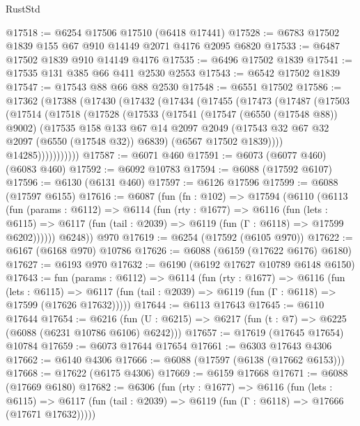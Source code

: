 \begin{lexlean}{RustStd}
\begin{coremodule}
@17518 := @6254 @17506 @17510 (@6418 @17441)
@17528 := @6783 @17502 @1839 @155 @67 @910 @14149 @2071 @4176 @2095 @6820
@17533 := @6487 @17502 @1839 @910 @14149 @4176
@17535 := @6496 @17502 @1839
@17541 := @17535 @131 @385 @66 @411 @2530 @2553
@17543 := @6542 @17502 @1839
@17547 := @17543 @88 @66 @88 @2530
@17548 := @6551 @17502
@17586 := @17362
    (@17388
      (@17430
        (@17432
          (@17434
            (@17455
              (@17473
                (@17487
                  (@17503
                    (@17514
                      (@17518
                        (@17528
                          (@17533
                            (@17541
                              (@17547 (@6550 (@17548 @88)) @9002)
                              (@17535
                                @158
                                @133
                                @67
                                @14
                                @2097
                                @2049
                                (@17543 @32 @67 @32 @2097 (@6550 (@17548 @32)) @6839)
                                (@6567 @17502 @1839))))
                          @14285)))))))))))
@17587 := @6071 @460
@17591 := @6073 (@6077 @460) (@6083 @460)
@17592 := @6092 @10783
@17594 := @6088 (@17592 @6107)
@17596 := @6130 (@6131 @460)
@17597 := @6126 @17596
@17599 := @6088 (@17597 @6155)
@17616 := @6087
    (fun (fn : @102) =>
    @17594
      (@6110
        (@6113
          (fun (params : @6112) =>
          @6114
            (fun (rty : @1677) =>
            @6116
              (fun (lets : @6115) =>
              @6117 (fun (tail : @2039) => @6119 (fun (Γ : @6118) => @17599 @6202))))))
        @6248))
    @970
@17619 := @6254 (@17592 (@6105 @970))
@17622 := @6167 (@6168 @970) @10786
@17626 := @6088 (@6159 (@17622 @6176) @6180)
@17627 := @6193 @970
@17632 := @6190 (@6192 @17627 @10789 @6148 @6150)
@17643 := fun (params : @6112) =>
  @6114
    (fun (rty : @1677) =>
    @6116
      (fun (lets : @6115) =>
      @6117 (fun (tail : @2039) => @6119 (fun (Γ : @6118) => @17599 (@17626 @17632)))))
@17644 := @6113 @17643
@17645 := @6110 @17644
@17654 := @6216
    (fun (U : @6215) => @6217 (fun (t : @7) => @6225 (@6088 (@6231 @10786 @6106) @6242)))
@17657 := @17619 (@17645 @17654) @10784
@17659 := @6073 @17644 @17654
@17661 := @6303 @17643 @4306
@17662 := @6140 @4306
@17666 := @6088 (@17597 (@6138 (@17662 @6153)))
@17668 := @17622 (@6175 @4306)
@17669 := @6159 @17668
@17671 := @6088 (@17669 @6180)
@17682 := @6306
    (fun (rty : @1677) =>
    @6116
      (fun (lets : @6115) =>
      @6117 (fun (tail : @2039) => @6119 (fun (Γ : @6118) => @17666 (@17671 @17632)))))

\end{coremodule}
\end{lexlean}
